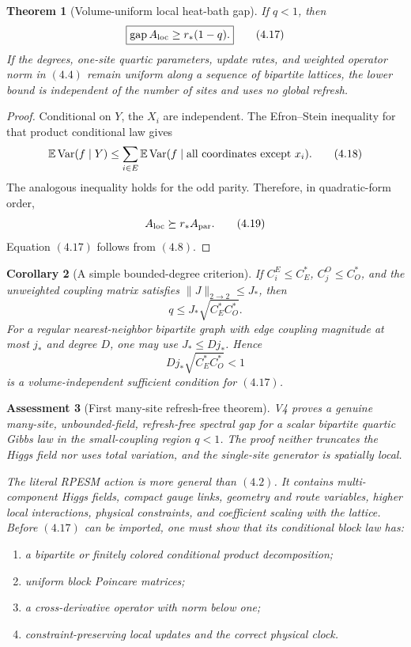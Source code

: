 \documentclass[11pt]{article}
\newtheorem{theorem}{Theorem}[section]
\newtheorem{corollary}[theorem]{Corollary}
\newtheorem{assessment}[theorem]{Assessment}
\theoremstyle{remark}
\begin{document}
\begin{theorem}[Volume-uniform local heat-bath gap]
\label{thm:v15v4-local-gap}
If \(q<1\), then
\[
 \boxed{\operatorname{gap}A_{\rm loc}
 \ge r_*(1-q).}                                              \tag{4.17}
\]
If the degrees, one-site quartic parameters, update rates, and
weighted operator norm in \((4.4)\) remain uniform along a
sequence of bipartite lattices, the lower bound is independent of
the number of sites and uses no global refresh.
\end{theorem}

\begin{proof}
Conditional on \(Y\), the \(X_i\) are independent.  The
Efron--Stein inequality for that product conditional law gives
\[
 \mathbb E\operatorname{Var}(f\mid Y)
 \le\sum_{i\in E}
 \mathbb E\operatorname{Var}
 (f\mid\hbox{all coordinates except }x_i).                  \tag{4.18}
\]
The analogous inequality holds for the odd parity.  Therefore, in
quadratic-form order,
\[
 A_{\rm loc}\succeq r_*A_{\rm par}.                          \tag{4.19}
\]
Equation \((4.17)\) follows from \((4.8)\).
\end{proof}

\begin{corollary}[A simple bounded-degree criterion]
\label{cor:v15v4-degree}
If \(C_i^E\le C_E^*\), \(C_j^O\le C_O^*\), and the unweighted
coupling matrix satisfies \(\|J\|_{2\to2}\le J_*\), then
\[
 q\le J_*\sqrt{C_E^*C_O^*}.                                  \tag{4.20}
\]
For a regular nearest-neighbor bipartite graph with edge coupling
magnitude at most \(j_*\) and degree \(D\), one may use
\(J_*\le Dj_*\).  Hence
\[
 Dj_*\sqrt{C_E^*C_O^*}<1                                    \tag{4.21}
\]
is a volume-independent sufficient condition for \((4.17)\).
\end{corollary}

\begin{assessment}[First many-site refresh-free theorem]
\label{ass:v15v4-result}
V4 proves a genuine many-site, unbounded-field, refresh-free
spectral gap for a scalar bipartite quartic Gibbs law in the
small-coupling region \(q<1\).  The proof neither truncates the
Higgs field nor uses total variation, and the single-site
generator is spatially local.

The literal RPESM action is more general than \((4.2)\).  It
contains multi-component Higgs fields, compact gauge links,
geometry and route variables, higher local interactions, physical
constraints, and coefficient scaling with the lattice.  Before
\((4.17)\) can be imported, one must show that its conditional
block law has:
\begin{enumerate}
\item a bipartite or finitely colored conditional product
      decomposition;
\item uniform block Poincare matrices;
\item a cross-derivative operator with norm below one;
\item constraint-preserving local updates and the correct physical
      clock.
\end{enumerate}
\end{assessment}
\end{document}
